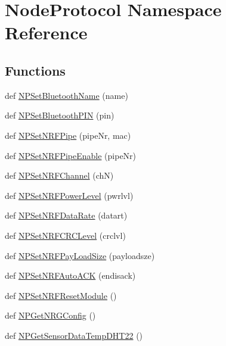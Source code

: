 \hypertarget{namespaceNodeProtocol}{}\section{Node\+Protocol Namespace Reference}
\label{namespaceNodeProtocol}
\subsection*{Functions}
\begin{DoxyCompactItemize}
\item 
def \hyperlink{namespaceNodeProtocol_a119cd90738517fbadbdaaaeaf652a318}{N\+P\+Set\+Bluetooth\+Name} (name)
\item 
def \hyperlink{namespaceNodeProtocol_a5600e00d89fba67ea4708943e7a008fa}{N\+P\+Set\+Bluetooth\+P\+IN} (pin)
\item 
def \hyperlink{namespaceNodeProtocol_a1272def8025a1b55e2d48b27e7860267}{N\+P\+Set\+N\+R\+F\+Pipe} (pipe\+Nr, mac)
\item 
def \hyperlink{namespaceNodeProtocol_ab5614ccbd21609c87f3ffa0f581b0cd9}{N\+P\+Set\+N\+R\+F\+Pipe\+Enable} (pipe\+Nr)
\item 
def \hyperlink{namespaceNodeProtocol_aa59027e38c4ca487af25a3016f2b8e98}{N\+P\+Set\+N\+R\+F\+Channel} (chN)
\item 
def \hyperlink{namespaceNodeProtocol_af638c01197210178a347c23c82752b14}{N\+P\+Set\+N\+R\+F\+Power\+Level} (pwrlvl)
\item 
def \hyperlink{namespaceNodeProtocol_a2e6059cfc101ffcbceaefcdeb036a3d8}{N\+P\+Set\+N\+R\+F\+Data\+Rate} (datart)
\item 
def \hyperlink{namespaceNodeProtocol_a205884be3186e0ac72e9ae5208c2e282}{N\+P\+Set\+N\+R\+F\+C\+R\+C\+Level} (crclvl)
\item 
def \hyperlink{namespaceNodeProtocol_a51a9986c745d69cbc3b63e23acbfb94b}{N\+P\+Set\+N\+R\+F\+Pay\+Load\+Size} (payloadsze)
\item 
def \hyperlink{namespaceNodeProtocol_ae1ead68ada531b176fec0c78db674268}{N\+P\+Set\+N\+R\+F\+Auto\+A\+CK} (endisack)
\item 
def \hyperlink{namespaceNodeProtocol_a68d6e8f5e47fa9b706284046039fefc5}{N\+P\+Set\+N\+R\+F\+Reset\+Module} ()
\item 
def \hyperlink{namespaceNodeProtocol_a3957886e60fe6740ed019e33293f1eb3}{N\+P\+Get\+N\+R\+G\+Config} ()
\item 
def \hyperlink{namespaceNodeProtocol_af237482548b3bfa9f568f612a3a8ddd3}{N\+P\+Get\+Sensor\+Data\+Temp\+D\+H\+T22} ()

\end{DoxyCompactItemize}
